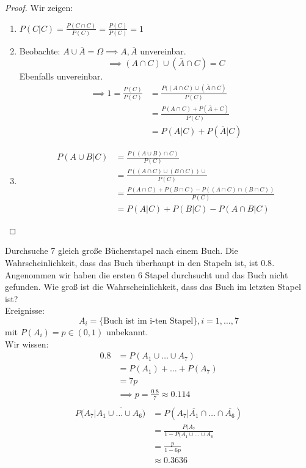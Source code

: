 \begin{proof}
Wir zeigen:
\begin{enumerate}
	\item $P(C|C)= \frac{P(C \cap C)}{P(C)}= \frac{P(C)}{P(C)}= 1$
	\item Beobachte: $A \cup \overline{A}= \Omega \implies A, \overline{A}$ unvereinbar.
		\[
		\implies (A \cap C) \cup (\overline{A} \cap C)=C
		\]
	Ebenfalls unvereinbar.
	\begin{align*}
		\implies 1 = \frac{P(C)}{P(C)} &= \frac{P((A \cap C) \cup (\overline{A} \cap C)}{P(C)} \\
					       &= \frac{P(A \cap C) + P(\overline{A}+C)}{P(C)} \\
					       &= P(A|C)+ P(\overline{A}|C)	
	\end{align*}
\item \begin{align*}
		P(A \cup B| C) &= \frac{P((A \cup B) \cap C)}{P(C)} \\
			       &= \frac{P((A \cap C) \cup (B \cap C)) \cup}{P(C)} \\
			       &= \frac{P(A \cap C) + P(B \cap C) - P((A \cap C) \cap (B \cap C))}{P(C)} \\
			       &= P(A |C ) + P(B|C) - P(A \cap B |C)
\end{align*}
\end{enumerate}
\end{proof}
\begin{example}[Stapelsuchproblem]
Durchsuche 7 gleich große Bücherstapel nach einem Buch. Die Wahrscheinlichkeit, dass das Buch überhaupt in den Stapeln ist, ist $0.8$.\\
Angenommen wir haben die ersten 6 Stapel durchsucht und das Buch nicht gefunden. Wie groß ist die Wahrscheinlichkeit, dass das Buch im letzten Stapel ist? \\
Ereignisse:
\[
A_i = \{\text{Buch ist im i-ten Stapel}\}, i = 1,\ldots,7 
\]
mit $P(A_i)=p \in (0,1)$ unbekannt. \\
Wir wissen: 
\begin{align*}
	0.8&= P(A_1 \cup \ldots \cup A_7) \\
	   &= P(A_1)+ \ldots + P(A_7) \\
	   &= 7p \\
	   &\implies p = \frac{0.8}{7} \approx 0.114 \\
\end{align*}
\begin{align*}
	P(A_7| \overline{A_1 \cup \ldots \cup A_6)}&= P(A_7 | \overline{A_1} \cap \ldots \cap \overline{A_6}) \\
						   &= \frac{P(A_7}{1-P(A_1 \cup \ldots \cup A_6} \\
						   &= \frac{p}{1-6p} \\
						   &\approx 0.3636
\end{align*}
\end{example}

